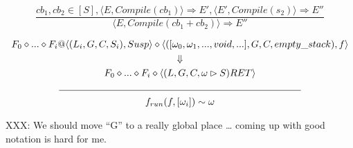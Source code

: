 \documentclass[]{article}
\numberwithin{equation}{section}
\numberwithin{figure}{section}
\numberwithin{table}{section}
\begin{document}
\[\frac{cb_1, cb_2 \in [S], \langle E, Compile(cb_1) \rangle \Rightarrow E', \langle E', Compile(s_2) \rangle \Rightarrow E''}
       {\langle E, Compile(cb_1 + cb_2) \rangle \Rightarrow E''}\]

\begin{gather*} F_0 \diamond ... \diamond F_i @\langle(L_i, G, C, S_i) , Susp \rangle \diamond \langle ([\omega_0, \omega_1, ..., void, ...], G, C, empty\_stack) , f \rangle \\ \Downarrow \\ F_0 \diamond ... \diamond F_i \diamond \langle (L, G, C, \omega \rhd S) RET \rangle \\ \line(1,0){250} \\f_{run}(f, [\omega_i]) \sim \omega
\end{gather*}


XXX: We should move ``G'' to a really global place \ldots{} coming up
with good notation is hard for me.
\end{document}
